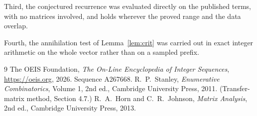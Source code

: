 \documentclass[11pt,a4paper]{article}
\theoremstyle{plain}
\theoremstyle{definition}
\begin{document}
Third, the conjectured recurrence was evaluated directly on the published terms, with no
matrices involved, and holds wherever the proved range and the data overlap.

Fourth, the annihilation test of Lemma~\ref{lem:crit} was carried out in exact integer
arithmetic on the whole vector rather than on a sampled prefix.

\begin{thebibliography}{9}
 The OEIS Foundation, \emph{The On-Line Encyclopedia of Integer
Sequences}, \url{https://oeis.org}, 2026. Sequence A267668.
 R.~P.~Stanley, \emph{Enumerative Combinatorics}, Volume 1, 2nd ed.,
Cambridge University Press, 2011. (Transfer-matrix method, Section 4.7.)
 R.~A.~Horn and C.~R.~Johnson, \emph{Matrix Analysis}, 2nd ed., Cambridge
University Press, 2013.
\end{thebibliography}
\end{document}

